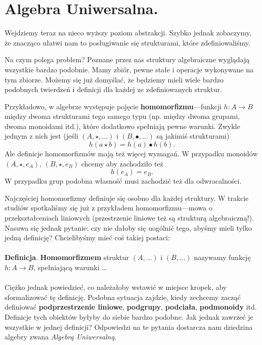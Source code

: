 \section{Algebra Uniwersalna.}
Wejdziemy teraz na nieco wyższy poziom abstrakcji.
Szybko jednak zobaczymy,
że znacząco ułatwi nam to posługiwanie się strukturami,
które zdefiniowaliśmy.

Na czym polega problem?
Poznane przez nas struktury algebraiczne wyglądają wszystkie bardzo podobnie.
Mamy zbiór, pewne stałe i operacje wykonywane na tym zbiorze.
Możemy się już domyślać,
	że będziemy mieli wiele bardzo podobnych twierdzeń i definicji dla każdej ze zdefiniowanych struktur.

Przykładowo,
	w algebrze występuje pojęcie \textbf{homomorfizmu}---funkcji $h: A \to B$ między dwoma strukturami
	tego samego typu (np. między dwoma grupami, dwoma monoidami itd.),
	które dodatkowo spełniają pewne warunki.
Zwykle jednym z nich jest (jeśli $(A, \star, \dots)$ i $(B, \bullet, \dots)$ są jakimiś strukturami)
\begin{equation}
	h(a\star b) = h(a) \bullet h(b).
\end{equation}
Ale definicje homomorfizmów mają też więcej wymagań.
W przypadku monoidów $(A, \star, e_A)$, $(B, \star, e_B)$ chcemy aby zachodziło też
\begin{equation}
	h(e_A) = e_B.
\end{equation}
W przypadku grup podobna własność musi zachodzić też dla odwracalności.

Najczęściej homomorfizmy definiuje się osobno dla każdej struktury.
W trakcie studiów spotkaliśmy się już z przykładem homomorfizmu---mowa o przekształceniach liniowych
	(przestrzenie liniowe też są strukturą algebraiczną!).
Nasuwa się jednak pytanie: czy nie dałoby się uogólnić tego,
	abyśmy mieli tylko jedną definicję?
Chcielibyśmy mieć coś takiej postaci:
\\\\
\noindent \textbf{Definicja}.
	\textbf{Homomorfizmem} struktur $(A, \dots)$ i $(B, \dots)$ nazywamy funkcję $h: A \to B$,
	spełniającą warunki \dots
\\\\
Ciężko jednak powiedzieć, co należałoby wstawić w miejsce kropek, aby sformalizować tę definicję.
Podobna sytuacja zajdzie,
    kiedy zechcemy zacząć definiować
	\textbf{podprzestrzenie liniowe}, \textbf{podgrupy}, \textbf{podciała}, \textbf{podmonoidy} itd.
Definicje tych obiektów byłyby do siebie bardzo podobne.
Jak jednak zawrzeć je wszystkie w jednej definicji?
Odpowiedzi na te pytania dostarcza nam dziedzina algebry zwana \textit{Algebrą Uniwersalną}.


